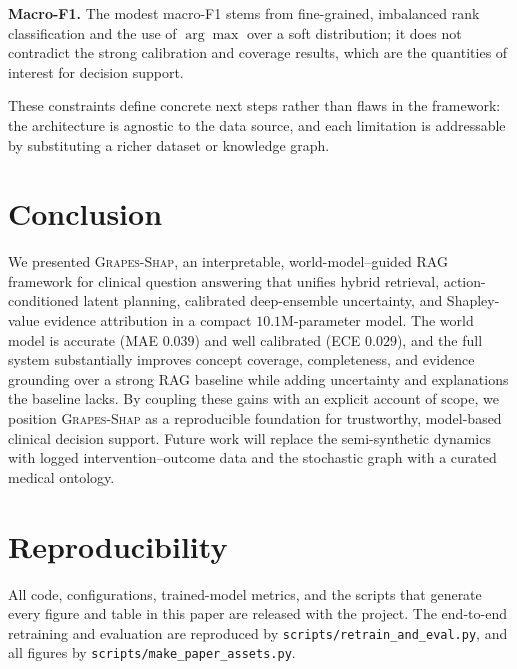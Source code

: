 \documentclass[conference]{IEEEtran}
\newcommand{\method}{\textsc{Grapes-Shap}}
\begin{document}
\textbf{Macro-F1.} The modest macro-F1 stems from fine-grained,
imbalanced rank classification and the use of $\arg\max$ over a soft
distribution; it does not contradict the strong calibration and coverage
results, which are the quantities of interest for decision support.

These constraints define concrete next steps rather than flaws in the
framework: the architecture is agnostic to the data source, and each limitation
is addressable by substituting a richer dataset or knowledge graph.

\section{Conclusion}
We presented \method, an interpretable, world-model--guided RAG framework for
clinical question answering that unifies hybrid retrieval, action-conditioned
latent planning, calibrated deep-ensemble uncertainty, and Shapley-value
evidence attribution in a compact $10.1$M-parameter model. The world model is
accurate (MAE $0.039$) and well calibrated (ECE $0.029$), and the full system
substantially improves concept coverage, completeness, and evidence grounding
over a strong RAG baseline while adding uncertainty and explanations the
baseline lacks. By coupling these gains with an explicit account of scope, we
position \method{} as a reproducible foundation for trustworthy,
model-based clinical decision support. Future work will replace the
semi-synthetic dynamics with logged intervention--outcome data and the
stochastic graph with a curated medical ontology.

\section*{Reproducibility}
All code, configurations, trained-model metrics, and the scripts that generate
every figure and table in this paper are released with the project. The
end-to-end retraining and evaluation are reproduced by
\texttt{scripts/retrain\_and\_eval.py}, and all figures by
\texttt{scripts/make\_paper\_assets.py}.



\end{document}
